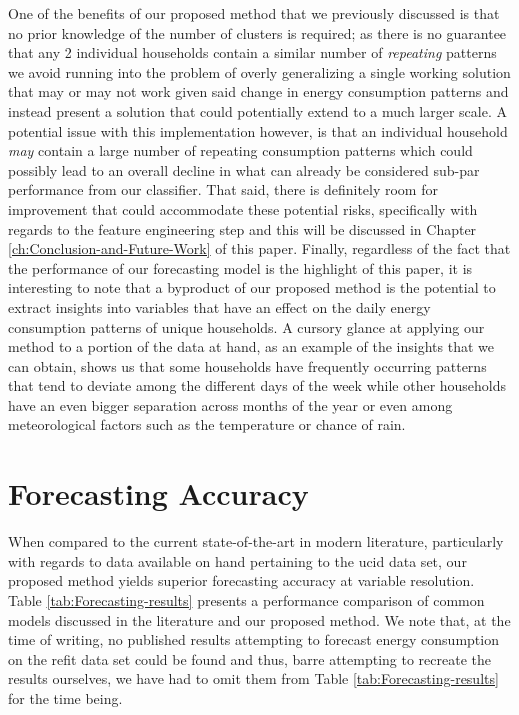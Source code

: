 \noindent \newline One of the benefits of our proposed method that we previously discussed is that no prior knowledge of the number of clusters is required; as there is no guarantee that any 2 individual households contain a similar number of \textit{repeating} patterns we avoid running into the problem of overly generalizing a single working solution that may or may not work given said change in energy consumption patterns and instead present a solution that could potentially extend to a much larger scale. A potential issue with this implementation however, is that an individual household \textit{may} contain a large number of repeating consumption patterns which could possibly lead to an overall decline in what can already be considered sub-par performance from our classifier. That said, there is definitely room for improvement that could accommodate these potential risks, specifically with regards to the feature engineering step and this will be discussed in Chapter \ref{ch:Conclusion-and-Future-Work} of this paper. Finally, regardless of the fact that the performance of our forecasting model is the highlight of this paper, it is interesting to note that a byproduct of our proposed method is the potential to extract insights into variables that have an effect on the daily energy consumption patterns of unique households. A cursory glance at applying our method to a portion of the data at hand, as an example of the insights that we can obtain, shows us that some households have frequently occurring patterns that tend to deviate among the different days of the week while other households have an even bigger separation across months of the year or even among meteorological factors such as the temperature or chance of rain.

\section{Forecasting Accuracy}
\label{sec:Results-and-Discussion:Forecasting-Accuracy}
When compared to the current state-of-the-art in modern literature, particularly with regards to data available on hand pertaining to the \gls{ucid} data set, our proposed method yields superior forecasting accuracy at variable resolution. Table \ref{tab:Forecasting-results} presents a performance comparison of common models discussed in the literature and our proposed method. We note that, at the time of writing, no published results attempting to forecast energy consumption on the \gls{refit} data set could be found and thus, barre attempting to recreate the results ourselves, we have had to omit them from Table \ref{tab:Forecasting-results} for the time being.


